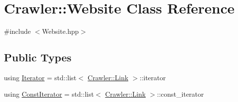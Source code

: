\hypertarget{class_crawler_1_1_website}{}\section{Crawler\+:\+:Website Class Reference}
\label{class_crawler_1_1_website}


{\ttfamily \#include $<$Website.\+hpp$>$}

\subsection*{Public Types}
\begin{DoxyCompactItemize}
\item 
using \hyperlink{class_crawler_1_1_website_ad323c2cfd249fc9cd2692c00eb50c0c9}{Iterator} = std\+::list$<$ \hyperlink{class_crawler_1_1_link}{Crawler\+::\+Link} $>$\+::iterator
\item 
using \hyperlink{class_crawler_1_1_website_acfbc2b2241aa025f4fc57965dfe69fdb}{Const\+Iterator} = std\+::list$<$ \hyperlink{class_crawler_1_1_link}{Crawler\+::\+Link} $>$\+::const\+\_\+iterator
\end{DoxyCompactItemize}
